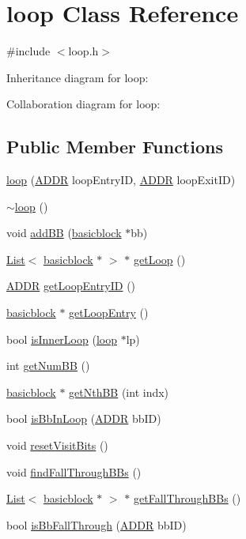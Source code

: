\hypertarget{classloop}{
\section{loop Class Reference}
\label{classloop}
}


{\ttfamily \#include $<$loop.h$>$}



Inheritance diagram for loop:


Collaboration diagram for loop:
\subsection*{Public Member Functions}
\begin{DoxyCompactItemize}
\item 
\hyperlink{classloop_a56aab74b3345d5731cd1243e2a41bc76}{loop} (\hyperlink{binaryTranslator_2global_8h_a8bb6b77b3aab51e3a8d1866dd5861225}{ADDR} loopEntryID, \hyperlink{binaryTranslator_2global_8h_a8bb6b77b3aab51e3a8d1866dd5861225}{ADDR} loopExitID)
\item 
\hyperlink{classloop_aad652628bd3d921231b869db97e528ad}{$\sim$loop} ()
\item 
void \hyperlink{classloop_aa9324a68eb1fc3b86eabff7815132443}{addBB} (\hyperlink{classbasicblock}{basicblock} $\ast$bb)
\item 
\hyperlink{classList}{List}$<$ \hyperlink{classbasicblock}{basicblock} $\ast$ $>$ $\ast$ \hyperlink{classloop_af5ef5dd07e6d5b52f318320cc7d6b037}{getLoop} ()
\item 
\hyperlink{binaryTranslator_2global_8h_a8bb6b77b3aab51e3a8d1866dd5861225}{ADDR} \hyperlink{classloop_a6abf8e7d6763e76673f8287fe15785d4}{getLoopEntryID} ()
\item 
\hyperlink{classbasicblock}{basicblock} $\ast$ \hyperlink{classloop_a30c7019f2202671a81d8a33f9a33593e}{getLoopEntry} ()
\item 
bool \hyperlink{classloop_a6a34ac2a05496bd2192638280e42c316}{isInnerLoop} (\hyperlink{classloop}{loop} $\ast$lp)
\item 
int \hyperlink{classloop_a81113f34513c9e9ae41886ea150cbd3d}{getNumBB} ()
\item 
\hyperlink{classbasicblock}{basicblock} $\ast$ \hyperlink{classloop_a69d626e1bbfa64a45f3ddf805998967a}{getNthBB} (int indx)
\item 
bool \hyperlink{classloop_aff5df3cffef530a6e4f81ecd4deed86e}{isBbInLoop} (\hyperlink{binaryTranslator_2global_8h_a8bb6b77b3aab51e3a8d1866dd5861225}{ADDR} bbID)
\item 
void \hyperlink{classloop_a49a50718778d9b23d51385a93aed10a8}{resetVisitBits} ()
\item 
void \hyperlink{classloop_a20ecb89d8b7cb21867fe53c6ad56f0f4}{findFallThroughBBs} ()
\item 
\hyperlink{classList}{List}$<$ \hyperlink{classbasicblock}{basicblock} $\ast$ $>$ $\ast$ \hyperlink{classloop_a6d90e411616771613671b11dd58d380d}{getFallThroughBBs} ()
\item 
bool \hyperlink{classloop_a550955b42ceff7c89445322abc564e28}{isBbFallThrough} (\hyperlink{binaryTranslator_2global_8h_a8bb6b77b3aab51e3a8d1866dd5861225}{ADDR} bbID)
\end{DoxyCompactItemize}


